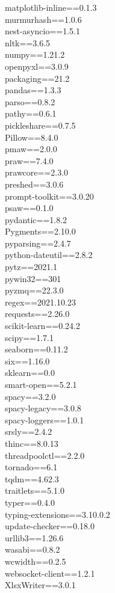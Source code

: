 \documentclass[11pt, a4paper]{article}
\begin{document}
matplotlib-inline==0.1.3\\
murmurhash==1.0.6\\
nest-asyncio==1.5.1\\
nltk==3.6.5\\
numpy==1.21.2\\
openpyxl==3.0.9\\
packaging==21.2\\
pandas==1.3.3\\
parso==0.8.2\\
pathy==0.6.1\\
pickleshare==0.7.5\\
Pillow==8.4.0\\
pmaw==2.0.0\\
praw==7.4.0\\
prawcore==2.3.0\\
preshed==3.0.6\\
prompt-toolkit==3.0.20\\
psaw==0.1.0\\
pydantic==1.8.2\\
Pygments==2.10.0\\
pyparsing==2.4.7\\
python-dateutil==2.8.2\\
pytz==2021.1\\
pywin32==301\\
pyzmq==22.3.0\\
regex==2021.10.23\\
requests==2.26.0\\
scikit-learn==0.24.2\\
scipy==1.7.1\\
seaborn==0.11.2\\
six==1.16.0\\
sklearn==0.0\\
smart-open==5.2.1\\
spacy==3.2.0\\
spacy-legacy==3.0.8\\
spacy-loggers==1.0.1\\
srsly==2.4.2\\
thinc==8.0.13\\
threadpoolctl==2.2.0\\
tornado==6.1\\
tqdm==4.62.3\\
traitlets==5.1.0\\
typer==0.4.0\\
typing-extensions==3.10.0.2\\
update-checker==0.18.0\\
urllib3==1.26.6\\
wasabi==0.8.2\\
wcwidth==0.2.5\\
websocket-client==1.2.1\\
XlsxWriter==3.0.1\\
\end{document}
